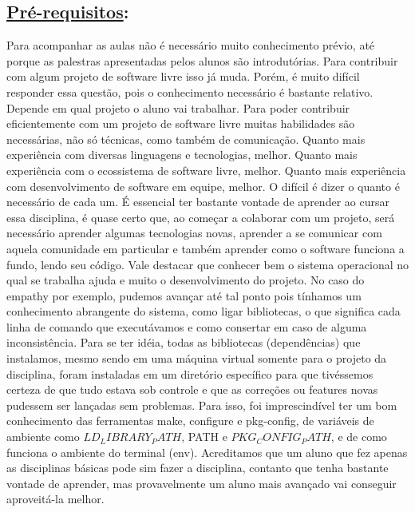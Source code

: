 \subsection*{\underline{Pré-requisitos}:}

Para acompanhar as aulas não é necessário muito conhecimento prévio, até porque as palestras apresentadas pelos alunos são introdutórias.
Para contribuir com algum projeto de software livre isso já muda. Porém, é muito difícil responder essa questão, pois o conhecimento necessário é bastante relativo. Depende em qual projeto o aluno vai trabalhar.
Para poder contribuir eficientemente com um projeto de software livre muitas habilidades são necessárias, não só técnicas, como também de comunicação. Quanto mais experiência com diversas linguagens e tecnologias, melhor. Quanto mais experiência com o ecossistema de software livre, melhor. Quanto mais experiência com desenvolvimento de software em equipe, melhor. O difícil é dizer o quanto é necessário de cada um.
É essencial ter bastante vontade de aprender ao cursar essa disciplina, é quase certo que, ao começar a colaborar com um projeto, será necessário aprender algumas tecnologias novas, aprender a se comunicar com aquela comunidade em particular e também aprender como o software funciona a fundo, lendo seu código.
    Vale destacar que conhecer bem o sistema operacional no qual se trabalha ajuda e muito o desenvolvimento do projeto. No caso do empathy por exemplo, pudemos avançar até tal ponto pois tínhamos um conhecimento abrangente do sistema, como ligar bibliotecas, o que significa cada linha de comando que executávamos e como consertar em caso de alguma inconsistência. Para se ter idéia, todas as bibliotecas (dependências) que instalamos, mesmo sendo em uma máquina virtual somente para o projeto da disciplina, foram instaladas em um diretório específico para que tivéssemos certeza de que tudo estava sob controle e que as correções ou features novas pudessem ser lançadas sem problemas. Para isso, foi imprescindível ter um bom conhecimento das ferramentas make, configure e pkg-config, de variáveis de ambiente como $LD_LIBRARY_PATH$, PATH e $PKG_CONFIG_PATH$, e de como funciona o ambiente do terminal (env).
Acreditamos que um aluno que fez apenas as disciplinas básicas pode sim fazer a disciplina, contanto que tenha bastante vontade de aprender, mas provavelmente um aluno mais avançado vai conseguir aproveitá-la melhor.
